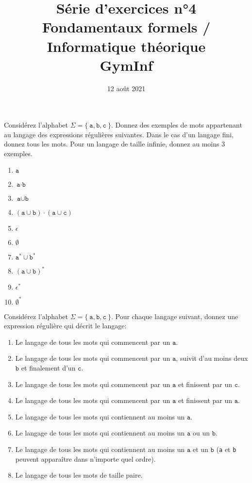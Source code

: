 \documentclass[12pt,french,a4paper]{article}
\begin{document}
\title{\vspace{-2cm}Série d'exercices n°4\\\large{Fondamentaux formels / Informatique théorique\\GymInf}}
\date{\vspace{-1cm}12 août 2021}

\maketitle

\begin{question}
Considérez l'alphabet $\Sigma = \{\ \texttt{a}, \texttt{b}, \texttt{c}\ \}$.
Donnez des exemples de mots appartenant au langage des expressions régulières suivantes.
Dans le cas d'un langage fini, donnez tous les mots. Pour un langage de taille infinie, donnez au moins 3 exemples.
\begin{enumerate}
\item $\texttt{a}$
\item $\texttt{a} \cdot \texttt{b}$
\item $\texttt{a} \cup \texttt{b}$
\item $(\texttt{a} \cup \texttt{b}) \cdot (\texttt{a} \cup \texttt{c})$
\item $\epsilon$
\item $\emptyset$
\item $\texttt{a}^* \cup \texttt{b}^*$
\item $(\texttt{a} \cup \texttt{b})^*$
\item $\epsilon^*$
\item $\emptyset^*$
\end{enumerate}
\end{question}

\begin{question}
Considérez l'alphabet $\Sigma = \{\ \texttt{a}, \texttt{b}, \texttt{c}\ \}$.
Pour chaque langage suivant, donnez une expression régulière qui décrit le langage:
\begin{enumerate}
\item Le langage de tous les mots qui commencent par un $\texttt{a}$.
\item Le langage de tous les mots qui commencent par un $\texttt{a}$, suivit d'au moins deux $\texttt{b}$ et finalement d'un $\texttt{c}$.
\item Le langage de tous les mots qui commencent par un $\texttt{a}$ et finissent par un $\texttt{c}$.
\item Le langage de tous les mots qui commencent par un $\texttt{a}$ et finissent par un $\texttt{a}$.
\item Le langage de tous les mots qui contiennent au moins un $\texttt{a}$.
\item Le langage de tous les mots qui contiennent au moins un $\texttt{a}$ ou un $\texttt{b}$.
\item Le langage de tous les mots qui contiennent au moins un $\texttt{a}$ et un $\texttt{b}$ (\texttt{a} et \texttt{b} peuvent apparaître dans n'importe quel ordre).
\item Le langage de tous les mots de taille paire.
\end{enumerate}
\end{question}
\end{document}
